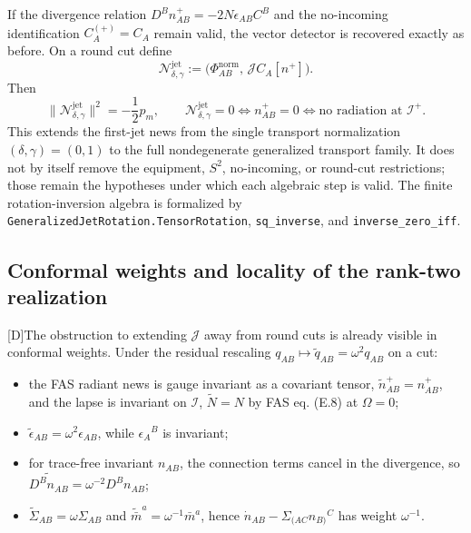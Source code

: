 \documentclass[11pt,a4paper]{article}
\newcommand{\scri}{\mathscr{I}}
\newcommand{\cN}{\mathcal{N}}
\newcommand{\statusD}{\textsf{[D]}}
\begin{document}
If the divergence relation \(D^Bn^+_{AB}=-2N\epsilon_{AB}C^B\) and the no-incoming identification \(C^{(+)}_A=C_A\) remain valid, the vector detector is recovered exactly as before.  On a round cut define
\begin{equation}\label{eq:generalized-first-jet-news}
  \cN^{\mathrm{jet}}_{\delta,\gamma}
  :=
  \big(\Phi^{\mathrm{norm}}_{AB},\,\mathcal J C_A[n^+]\big) .
\end{equation}
Then
\begin{equation}
  \|\cN^{\mathrm{jet}}_{\delta,\gamma}\|^2
  =
  -\frac12 p_m,
  \qquad
  \cN^{\mathrm{jet}}_{\delta,\gamma}=0
  \iff
  n^+_{AB}=0
  \iff
  \text{no radiation at }\scri^+ .
\end{equation}
This extends the first-jet news from the single transport normalization \((\delta,\gamma)=(0,1)\) to the full nondegenerate generalized transport family.  It does not by itself remove the equipment, \(S^2\), no-incoming, or round-cut restrictions; those remain the hypotheses under which each algebraic step is valid.  The finite rotation-inversion algebra is formalized by \texttt{GeneralizedJetRotation.TensorRotation}, \texttt{sq\_inverse}, and \texttt{inverse\_zero\_iff}.

\subsection{Conformal weights and locality of the rank-two realization}

\statusD The obstruction to extending \(\mathcal J\) away from round cuts is already visible in conformal weights.  Under the residual rescaling \(q_{AB}\mapsto \tilde q_{AB}=\omega^2q_{AB}\) on a cut:

\begin{itemize}
  \item the FAS radiant news is gauge invariant as a covariant tensor, \(\tilde n^+_{AB}=n^+_{AB}\), and the lapse is invariant on \(\scri\), \(\tilde N=N\) by FAS eq. (E.8) at \(\Omega=0\);
  \item \(\tilde\epsilon_{AB}=\omega^2\epsilon_{AB}\), while \(\epsilon_A{}^B\) is invariant;
  \item for trace-free invariant \(n_{AB}\), the connection terms cancel in the divergence, so \(\widetilde{D^Bn_{AB}}=\omega^{-2}D^Bn_{AB}\);
  \item \(\tilde\Sigma_{AB}=\omega\Sigma_{AB}\) and \(\tilde{\bar m}^a=\omega^{-1}\bar m^a\), hence \(\dot n_{AB}-\Sigma_{(AC}n_{B)}{}^C\) has weight \(\omega^{-1}\).
\end{itemize}
\end{document}
